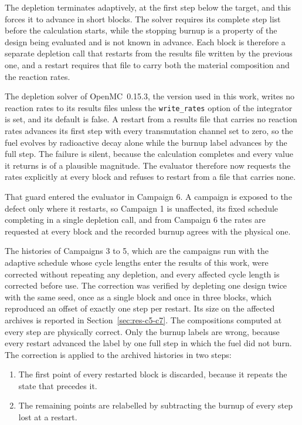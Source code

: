 The depletion terminates adaptively, at the first step below the
target, and this forces it to advance in short blocks. The solver requires its complete step list before the
calculation starts, while the stopping burnup is a property of the
design being evaluated and is not known in advance. Each block is
therefore a separate depletion call that restarts from the results
file written by the previous one, and a restart requires that file to
carry both the material composition and the reaction rates.

\label{sec:restart_defect}%
The depletion solver of OpenMC~0.15.3, the version used in this work,
writes no reaction rates to its results files unless the
\texttt{write\_rates} option of the integrator is set, and its default
is false. A restart from a
results file that carries no reaction rates advances its first step
with every transmutation channel set to zero, so the fuel evolves by radioactive decay alone
while the burnup label advances by the full step. The failure is
silent, because the calculation completes and every value it returns
is of a plausible magnitude. The evaluator therefore now requests the
rates explicitly at every block and refuses to restart from a file
that carries none.

That guard entered the evaluator in Campaign 6. A campaign is exposed
to the defect only where it restarts, so Campaign 1 is unaffected, its
fixed schedule completing in a single depletion call, and from Campaign
6 the rates are requested at every block and the recorded burnup agrees
with the physical one.

The histories of Campaigns 3 to 5, which are the campaigns run with
the adaptive schedule whose cycle lengths enter the results of this
work, were corrected without repeating any depletion, and every
affected cycle length is corrected before use.
The correction was verified by depleting one design twice with the same
seed, once as a single block and once in three blocks, which reproduced
an offset of exactly one step per restart. Its size on the affected
archives is reported in Section~\ref{sec:res-c5-c7}. The compositions
computed at every step are physically correct. Only the burnup labels
are wrong, because every restart advanced the label by one full step in
which the fuel did not burn. The correction is applied to the archived
histories in two steps:

\begin{enumerate}
  \item The first point of every restarted block is discarded, because
        it repeats the state that precedes it.

  \item The remaining points are relabelled by subtracting the burnup
        of every step lost at a restart.
\end{enumerate}

